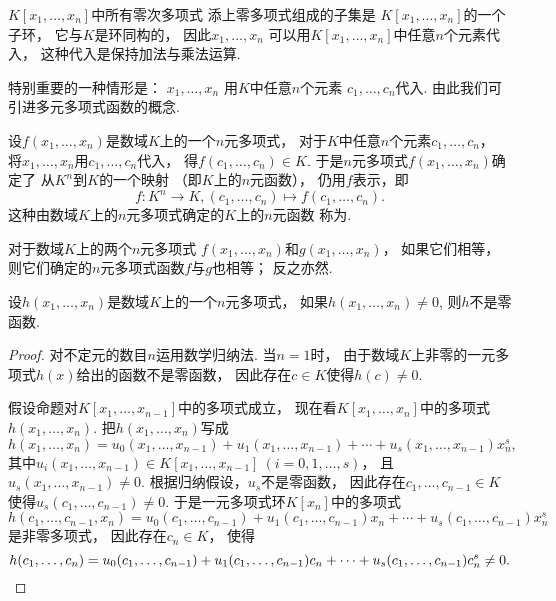 \(K[x_1,\dotsc,x_n]\)中所有零次多项式
添上零多项式组成的子集是
\(K[x_1,\dotsc,x_n]\)的一个子环，
它与\(K\)是环同构的，
因此\(x_1,\dotsc,x_n\)
可以用\(K[x_1,\dotsc,x_n]\)中任意\(n\)个元素代入，
这种代入是保持加法与乘法运算.

特别重要的一种情形是：
\(x_1,\dotsc,x_n\)
用\(K\)中任意\(n\)个元素
\(c_1,\dotsc,c_n\)代入.
由此我们可引进多元多项式函数的概念.

设\(f(x_1,\dotsc,x_n)\)是数域\(K\)上的一个\(n\)元多项式，
对于\(K\)中任意\(n\)个元素\(c_1,\dotsc,c_n\)，
将\(x_1,\dotsc,x_n\)用\(c_1,\dotsc,c_n\)代入，
得\(f(c_1,\dotsc,c_n) \in K\).
于是\(n\)元多项式\(f(x_1,\dotsc,x_n)\)确定了
从\(K^n\)到\(K\)的一个映射
（即\(K\)上的\(n\)元函数），
仍用\(f\)表示，即\[
	f\colon
	K^n \to K,
	(c_1,\dotsc,c_n)
	\mapsto
	f(c_1,\dotsc,c_n).
\]
这种由数域\(K\)上的\(n\)元多项式确定的\(K\)上的\(n\)元函数
称为.

对于数域\(K\)上的两个\(n\)元多项式
\(f(x_1,\dotsc,x_n)\)和\(g(x_1,\dotsc,x_n)\)，
如果它们相等，
则它们确定的\(n\)元多项式函数\(f\)与\(g\)也相等；
反之亦然.

\begin{lemma}
设\(h(x_1,\dotsc,x_n)\)是数域\(K\)上的一个\(n\)元多项式，
如果\(h(x_1,\dotsc,x_n)\neq0\),
则\(h\)不是零函数.
\begin{proof}
对不定元的数目\(n\)运用数学归纳法.
当\(n=1\)时，
由于数域\(K\)上非零的一元多项式\(h(x)\)给出的函数不是零函数，
因此存在\(c \in K\)使得\(h(c)\neq0\).

假设命题对\(K[x_1,\dotsc,x_{n-1}]\)中的多项式成立，
现在看\(K[x_1,\dotsc,x_n]\)中的多项式\(h(x_1,\dotsc,x_n)\).
把\(h(x_1,\dotsc,x_n)\)写成\[
	h(x_1,\dotsc,x_n)
	=u_0(x_1,\dotsc,x_{n-1})
	+u_1(x_1,\dotsc,x_{n-1})
	+\dotsb
	+u_s(x_1,\dotsc,x_{n-1}) x_n^s,
\]
其中\(u_i(x_1,\dotsc,x_{n-1}) \in K[x_1,\dotsc,x_{n-1}]\ (i=0,1,\dotsc,s)\)，
且\(u_s(x_1,\dotsc,x_{n-1})\neq0\).
根据归纳假设，\(u_s\)不是零函数，
因此存在\(c_1,\dotsc,c_{n-1} \in K\)
使得\(u_s(c_1,\dotsc,c_{n-1})\neq0\).
于是一元多项式环\(K[x_n]\)中的多项式\[
	h(c_1,\dotsc,c_{n-1},x_n)
	=u_0(c_1,\dotsc,c_{n-1})
	+u_1(c_1,\dotsc,c_{n-1}) x_n
	+\dotsb
	+u_s(c_1,\dotsc,c_{n-1}) x_n^s
\]是非零多项式，
因此存在\(c_n \in K\)，
使得\[
	h(c_1,\dotsc,c_n)
	=u_0(c_1,\dotsc,c_{n-1})
	+u_1(c_1,\dotsc,c_{n-1}) c_n
	+\dotsb
	+u_s(c_1,\dotsc,c_{n-1}) c_n^s
	\neq0.
	\qedhere
\]
\end{proof}
\end{lemma}

